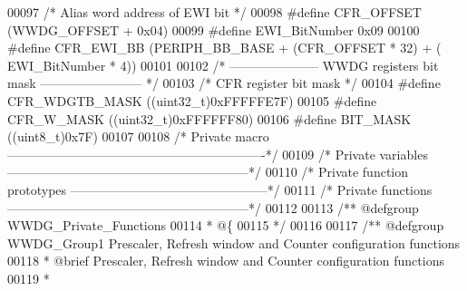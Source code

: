 \begin{DoxyCode}
00097 \textcolor{comment}{/* Alias word address of EWI bit */}
00098 \textcolor{preprocessor}{#}\textcolor{preprocessor}{define} \textcolor{preprocessor}{CFR\_OFFSET}        \textcolor{preprocessor}{(}WWDG_OFFSET \textcolor{preprocessor}{+} 0x04\textcolor{preprocessor}{)}
00099 \textcolor{preprocessor}{#}\textcolor{preprocessor}{define} \textcolor{preprocessor}{EWI\_BitNumber}     0x09
00100 \textcolor{preprocessor}{#}\textcolor{preprocessor}{define} \textcolor{preprocessor}{CFR\_EWI\_BB}        \textcolor{preprocessor}{(}PERIPH_BB_BASE \textcolor{preprocessor}{+} \textcolor{preprocessor}{(}CFR_OFFSET \textcolor{preprocessor}{*} 32\textcolor{preprocessor}{)} \textcolor{preprocessor}{+} \textcolor{preprocessor}{(}
      EWI_BitNumber \textcolor{preprocessor}{*} 4\textcolor{preprocessor}{)}\textcolor{preprocessor}{)}
00101 
00102 \textcolor{comment}{/* --------------------- WWDG registers bit mask ------------------------ */}
00103 \textcolor{comment}{/* CFR register bit mask */}
00104 \textcolor{preprocessor}{#}\textcolor{preprocessor}{define} \textcolor{preprocessor}{CFR\_WDGTB\_MASK}    \textcolor{preprocessor}{(}\textcolor{preprocessor}{(}\textcolor{preprocessor}{uint32\_t}\textcolor{preprocessor}{)}0xFFFFFE7F\textcolor{preprocessor}{)}
00105 \textcolor{preprocessor}{#}\textcolor{preprocessor}{define} \textcolor{preprocessor}{CFR\_W\_MASK}        \textcolor{preprocessor}{(}\textcolor{preprocessor}{(}\textcolor{preprocessor}{uint32\_t}\textcolor{preprocessor}{)}0xFFFFFF80\textcolor{preprocessor}{)}
00106 \textcolor{preprocessor}{#}\textcolor{preprocessor}{define} \textcolor{preprocessor}{BIT\_MASK}          \textcolor{preprocessor}{(}\textcolor{preprocessor}{(}\textcolor{preprocessor}{uint8\_t}\textcolor{preprocessor}{)}0x7F\textcolor{preprocessor}{)}
00107 
00108 \textcolor{comment}{/* Private macro -------------------------------------------------------------*/}
00109 \textcolor{comment}{/* Private variables ---------------------------------------------------------*/}
00110 \textcolor{comment}{/* Private function prototypes -----------------------------------------------*/}
00111 \textcolor{comment}{/* Private functions ---------------------------------------------------------*/}
00112 
00113 \textcolor{comment}{/** @defgroup WWDG\_Private\_Functions}
00114 \textcolor{comment}{  * @\{}
00115 \textcolor{comment}{  */}
00116 
00117 \textcolor{comment}{/** @defgroup WWDG\_Group1 Prescaler, Refresh window and Counter configuration functions}
00118 \textcolor{comment}{ *  @brief   Prescaler, Refresh window and Counter configuration functions }
00119 \textcolor{comment}{ *}

\end{DoxyCode}
